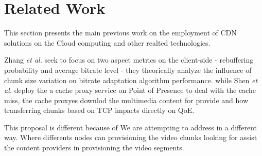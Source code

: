 \section{Related Work}
\label{sec:releated-work}

This section presents the main previous work on the employment of CDN solutions on the Cloud computing and other realted technologies. 


Zhang \textit{et al.} seek to focus on two aspect metrics on the client-side - rebuffering probability and average bitrate level - they theorically analyze the influence of chunk size variation on bitrate adaptation algorithm performance. while Shen \textit{et al.} deploy the a cache proxy service on Point of Presence to deal with the cache miss, the cache proxyes downlod the multimedia content for provide and how transferring chunks based on TCP impacts directly on QoE.



This proposal is different because of We are attempting to address in a different way. Where differents nodes can provisioning the video chunks looking for assist the content providers in provisioning the video segments. 





